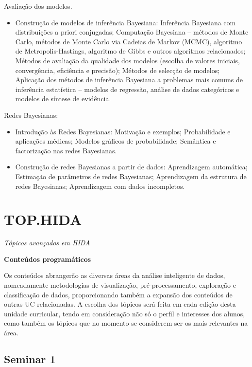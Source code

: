 \documentclass[]{book}
\providecommand{\tightlist}{%
  \setlength{\itemsep}{0pt}\setlength{\parskip}{0pt}}
\begin{document}
Avaliação dos modelos.

\begin{itemize}
\tightlist
\item
  Construção de modelos de inferência Bayesiana: Inferência Bayesiana com distribuições a priori conjugadas; Computação Bayesiana -- métodos de Monte Carlo, métodos de Monte Carlo via Cadeias de Markov (MCMC), algoritmo de Metropolis-Hastings, algoritmo de Gibbs e outros algoritmos relacionados; Métodos de avaliação da qualidade dos modelos (escolha de valores iniciais, convergência, eficiência e precisão); Métodos de selecção de modelos; Aplicação dos métodos de inferência Bayesiana a problemas mais comuns de inferência estatística -- modelos de regressão, análise de dados categóricos e modelos de síntese de evidência.
\end{itemize}

Redes Bayesianas:

\begin{itemize}
\item
  Introdução às Redes Bayesianas: Motivação e exemplos; Probabilidade e aplicações médicas; Modelos gráficos de probabilidade; Semântica e factorização nas redes Bayesianas.
\item
  Construção de redes Bayesianas a partir de dados: Aprendizagem automática; Estimação de parâmetros de redes Bayesianas; Aprendizagem da estrutura de redes Bayesianas; Aprendizagem com dados incompletos.
\end{itemize}

\hypertarget{top}{%
\chapter{TOP.HIDA}\label{top}}

\emph{Tópicos avançados em HIDA}

\textbf{Conteúdos programáticos}

Os conteúdos abrangerão as diversas áreas da análise inteligente de dados, nomeadamente metodologias de visualização, pré-processamento, exploração e classificação de dados, proporcionando também a expansão dos conteúdos de outras UC relacionadas. A escolha dos tópicos será feita em cada edição desta unidade curricular, tendo em consideração não só o perfil e interesses dos alunos, como também os tópicos que no momento se considerem ser os mais relevantes na área.

\hypertarget{seminar1}{%
\section{Seminar 1}\label{seminar1}}
\end{document}
